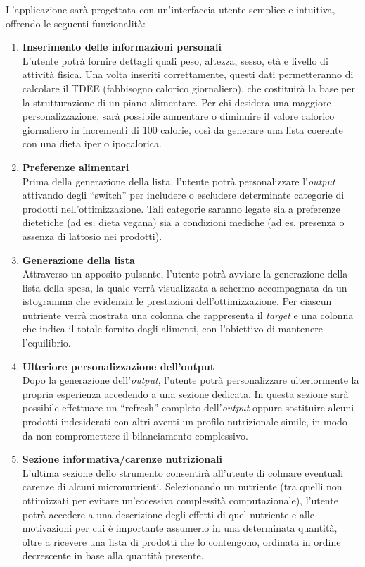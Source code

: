 \documentclass[11pt,a4paper]{article}
\begin{document}
L’applicazione sarà progettata con un’interfaccia utente semplice e intuitiva, offrendo le seguenti funzionalità:
\begin{enumerate}
    \item \textbf{Inserimento delle informazioni personali}\\
    L’utente potrà fornire dettagli quali peso, altezza, sesso, età e livello di attività fisica. Una volta inseriti correttamente, questi dati permetteranno di calcolare il TDEE (fabbisogno calorico giornaliero), che costituirà la base per la strutturazione di un piano alimentare. Per chi desidera una maggiore personalizzazione, sarà possibile aumentare o diminuire il valore calorico giornaliero in incrementi di 100 calorie, così da generare una lista coerente con una dieta iper o ipocalorica.
    
    \item \textbf{Preferenze alimentari}\\
    Prima della generazione della lista, l’utente potrà personalizzare l’\textit{output} attivando degli ``switch'' per includere o escludere determinate categorie di prodotti nell’ottimizzazione. Tali categorie saranno legate sia a preferenze dietetiche (ad es. dieta vegana) sia a condizioni mediche (ad es. presenza o assenza di lattosio nei prodotti).
    
    \item \textbf{Generazione della lista}\\
    Attraverso un apposito pulsante, l’utente potrà avviare la generazione della lista della spesa, la quale verrà visualizzata a schermo accompagnata da un istogramma che evidenzia le prestazioni dell’ottimizzazione. Per ciascun nutriente verrà mostrata una colonna che rappresenta il \textit{target} e una colonna che indica il totale fornito dagli alimenti, con l’obiettivo di mantenere l’equilibrio.
    
    \item \textbf{Ulteriore personalizzazione dell’output}\\
    Dopo la generazione dell’\textit{output}, l’utente potrà personalizzare ulteriormente la propria esperienza accedendo a una sezione dedicata. In questa sezione sarà possibile effettuare un ``refresh'' completo dell’\textit{output} oppure sostituire alcuni prodotti indesiderati con altri aventi un profilo nutrizionale simile, in modo da non compromettere il bilanciamento complessivo.
    
    \item \textbf{Sezione informativa/carenze nutrizionali}\\
    L’ultima sezione dello strumento consentirà all’utente di colmare eventuali carenze di alcuni micronutrienti. Selezionando un nutriente (tra quelli non ottimizzati per evitare un’eccessiva complessità computazionale), l’utente potrà accedere a una descrizione degli effetti di quel nutriente e alle motivazioni per cui è importante assumerlo in una determinata quantità, oltre a ricevere una lista di prodotti che lo contengono, ordinata in ordine decrescente in base alla quantità presente.
\end{enumerate}
\end{document}
